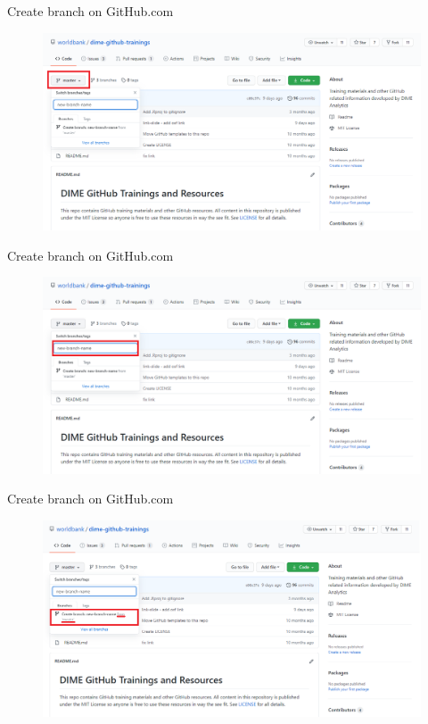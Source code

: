 \documentclass[aspectratio=169]{beamer} %
\begin{document}
\begin{frame}{Create branch on GitHub.com}
\label{new-branch}

\begin{figure}
	\centering
	\includegraphics[width=.9\textwidth]{./img/new-branch-1.png}
\end{figure}
\end{frame}

\begin{frame}{Create branch on GitHub.com}
\begin{figure}
	\centering
	\includegraphics[width=.9\textwidth]{./img/new-branch-2.png}
\end{figure}
\end{frame}

\begin{frame}{Create branch on GitHub.com}
\begin{figure}
	\centering
	\includegraphics[width=.9\textwidth]{./img/new-branch-3.png}
\end{figure}
\hyperlink{Create a branch}{}
\end{frame}
\end{document}
